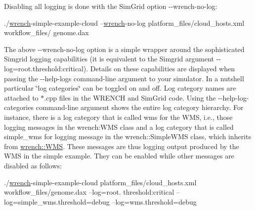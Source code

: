 Disabling all logging is done with the Sim\+Grid option {\ttfamily -\/-\/wrench-\/no-\/log}\+:


\begin{DoxyCode}
./\hyperlink{namespacewrench}{wrench}-simple-example-cloud  --\hyperlink{namespacewrench}{wrench}-no-log platform\_files/cloud\_hosts.xml workflow\_files/
      genome.dax
\end{DoxyCode}


The above {\ttfamily -\/-\/wrench-\/no-\/log} option is a simple wrapper around the sophisticated Simgrid logging capabilities (it is equivalent to the Simgrid argument {\ttfamily -\/-\/log=root.\+threshold\+:critical}). Details on these capabilities are displayed when passing the {\ttfamily -\/-\/help-\/logs} command-\/line argument to your simulator. In a nutshell particular \char`\"{}log categories\char`\"{} can be toggled on and off. Log category names are attached to {\ttfamily $\ast$.cpp} files in the W\+R\+E\+N\+CH and Sim\+Grid code. Using the {\ttfamily -\/-\/help-\/log-\/categories} command-\/line argument shows the entire log category hierarchy. For instance, there is a log category that is called {\ttfamily wms} for the W\+MS, i.\+e., those logging messages in the {\ttfamily wrench\+:W\+MS} class and a log category that is called {\ttfamily simple\+\_\+wms} for logging message in the {\ttfamily wrench\+::\+Simple\+W\+MS} class, which inherits from {\ttfamily \hyperlink{classwrench_1_1_w_m_s}{wrench\+::\+W\+MS}}. These messages are thus logging output produced by the W\+MS in the simple example. They can be enabled while other messages are disabled as follows\+:


\begin{DoxyCode}
./\hyperlink{namespacewrench}{wrench}-simple-example-cloud   platform\_files/cloud\_hosts.xml workflow\_files/genome.dax --log=root.
      threshold:critical --log=simple\_wms.threshold=debug --log=wms.threshold=debug
\end{DoxyCode}


